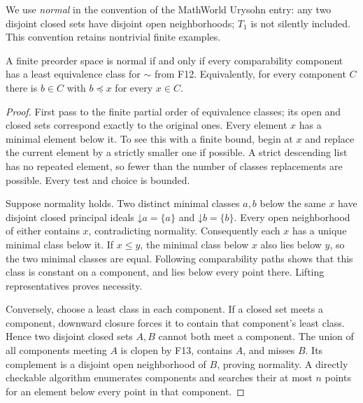 We use \emph{normal} in the convention of the MathWorld Urysohn
entry: any two disjoint closed sets have disjoint open
neighborhoods; $T_1$ is not silently included.  This convention
retains nontrivial finite examples.

\begin{theorem}\label{thm:finite-normal}
A finite preorder space is normal if and only if every
comparability component has a least equivalence class for
$\sim$ from F12.  Equivalently, for every component $C$ there is
$b\in C$ with $b\preceq x$ for every $x\in C$.
\end{theorem}
\begin{proof}
First pass to the finite partial order of equivalence classes;
its open and closed sets correspond exactly to the original ones.
Every element $x$ has a minimal element below it.  To see this
with a finite bound, begin at $x$ and replace the current element
by a strictly smaller one if possible.  A strict descending list
has no repeated element, so fewer than the number of classes
replacements are possible.  Every test and choice is bounded.

Suppose normality holds.  Two distinct minimal classes $a,b$
below the same $x$ have disjoint closed principal ideals
$\mathord\downarrow a=\{a\}$ and
$\mathord\downarrow b=\{b\}$.  Every open neighborhood of
either contains $x$, contradicting normality.  Consequently
each $x$ has a unique minimal class below it.  If $x\leq y$,
the minimal class below $x$ also lies below $y$, so the two
minimal classes are equal.  Following comparability paths shows
that this class is constant on a component, and lies below
every point there.  Lifting representatives proves necessity.

Conversely, choose a least class in each component.  If a closed
set meets a component, downward closure forces it to contain
that component's least class.  Hence two disjoint closed sets
$A,B$ cannot both meet a component.  The union of all components
meeting $A$ is clopen by F13, contains $A$, and misses $B$.
Its complement is a disjoint open neighborhood of $B$, proving
normality.  A directly checkable algorithm enumerates components
and searches their at most $n$ points for an element below every
point in that component.
\end{proof}


